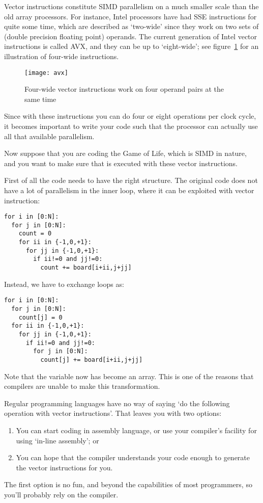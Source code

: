 Vector instructions constitute \ac{SIMD} parallelism on a much smaller
scale than the old array processors. For instance, Intel processors
have had \acf{SSE} instructions for quite some time, which are
described as `two-wide' since they work on two sets of 
(double precision floating point) operands.  The
current generation of Intel vector instructions is called \acf{AVX},
and they can be up to `eight-wide'; see figure~\ref{fig:avx}
for an illustration of four-wide instructions.
\begin{figure}[t]
  \texttt{[image: avx]}
  \caption{Four-wide vector instructions work on four operand pairs at the same time}
  \label{fig:avx}
\end{figure}
Since with these instructions you can do four or eight operations per
clock cycle, it becomes important to write your code such that the
processor can actually use all that available parallelism.

Now suppose that you are coding the Game of Life, which is \ac{SIMD} in nature,
and you want to make sure that is executed with these vector instructions.

First of all the code needs to have the right structure. The original code
does not have a lot of parallelism in the inner loop, where it
can be exploited with vector instruction:
\begin{verbatim}
for i in [0:N]:
  for j in [0:N]:
    count = 0
    for ii in {-1,0,+1}:
      for jj in {-1,0,+1}:
        if ii!=0 and jj!=0:
          count += board[i+ii,j+jj]
\end{verbatim}
Instead, we have to exchange loops as:
\begin{verbatim}
for i in [0:N]:
  for j in [0:N]:
    count[j] = 0
  for ii in {-1,0,+1}:
    for jj in {-1,0,+1}:
      if ii!=0 and jj!=0:
        for j in [0:N]:
          count[j] += board[i+ii,j+jj]
\end{verbatim}
Note that the  variable now has become an array.
This is one of the reasons that compilers are unable to make this transformation.

Regular programming languages have no way of saying `do the following
operation with vector instructions'. That leaves you with two options:
\begin{enumerate}
\item You can start coding in assembly language, or use your
  compiler's facility for using `in-line assembly'; or
\item You can hope that the compiler understands your code enough to generate
  the vector instructions for you.
\end{enumerate}
The first option is no fun, and beyond the capabilities of most programmers,
so you'll probably rely on the compiler.

